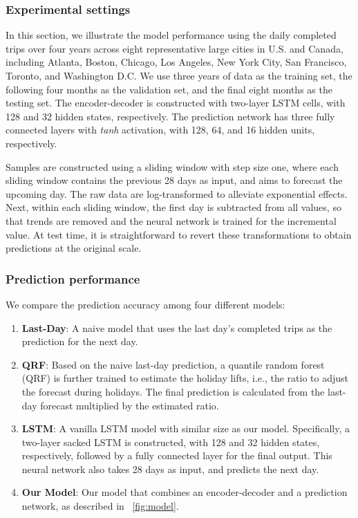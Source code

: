 \documentclass[conference,compsoc,final]{IEEEtran}
\begin{document}
\subsubsection{Experimental settings}
In this section, we illustrate the model performance using the daily completed trips over four years across eight representative large cities in U.S. and Canada, including Atlanta, Boston, Chicago, Los Angeles, New York City,  San Francisco, Toronto, and Washington D.C. We use three years of data as the training set, the following four months as the validation set, and the final eight months as the testing set. The encoder-decoder is constructed with two-layer LSTM cells, with 128 and 32 hidden states, respectively. The prediction network has three fully connected layers with {\it tanh} activation, with 128, 64, and 16 hidden units, respectively.

Samples are constructed using a sliding window with step size one, where each sliding window contains the previous 28 days as input, and aims to forecast the upcoming day. The raw data are log-transformed to alleviate exponential effects. Next, within each sliding window, the first day is subtracted from all values, so that trends are removed and the neural network is trained for the incremental value. At test time, it is straightforward to revert these transformations to obtain predictions at the original scale. 


\subsubsection{Prediction performance}

We compare the prediction accuracy among four different models:
\begin{enumerate}
\item {\bf Last-Day}: A naive model that uses the last day's completed trips as the prediction for the next day.
\item {\bf QRF}: Based on the naive last-day prediction, a quantile random forest (QRF) is further trained to estimate the holiday lifts, i.e., the ratio to adjust the forecast during holidays. The final prediction is calculated from the last-day forecast multiplied by the estimated ratio.
\item {\bf LSTM}: A vanilla LSTM model with similar size as our model. Specifically, a two-layer sacked LSTM is constructed, with 128 and 32 hidden states, respectively, followed by a fully connected layer for the final output. This neural network also takes 28 days as input, and predicts the next day.
\item {\bf Our Model}: Our model that combines an encoder-decoder and a prediction network, as described in \figurename~\ref{fig:model}.
\end{enumerate}
\end{document}
